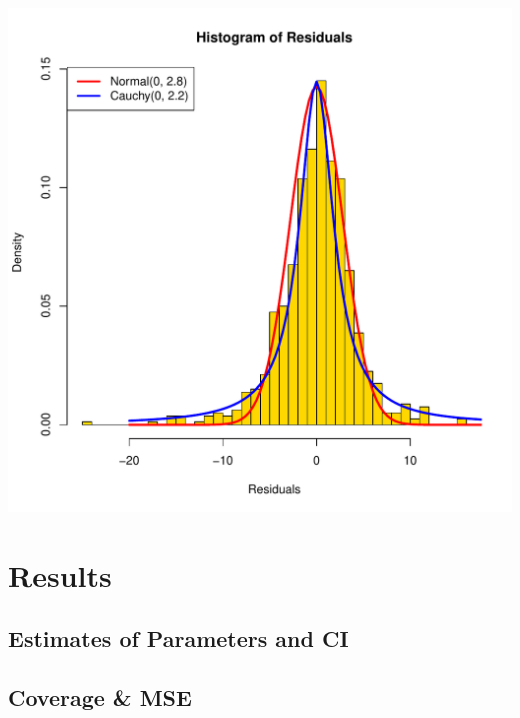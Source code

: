 \documentclass{article}                                                   %
\begin{document}
    \includegraphics{raw/hist.pdf}
\section{Results}
  \subsection{Estimates of Parameters and CI}
    
  \subsection{Coverage \& MSE }
    
\end{document}
